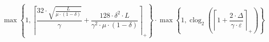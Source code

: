 \[\max\left\{ 1, \left\lceil \frac{32 \cdot \sqrt{\frac{L}{\mu \cdot \left(1 - \delta\right)}}}{\gamma} + \frac{128 \cdot \delta^{2} \cdot L}{\gamma^{2} \cdot \mu \cdot \left(1 - \delta\right)} \right\rceil_{+} \right\} \cdot \max\left\{ 1, \operatorname{clog}_{2}\left(\left\lceil 1 + \frac{2 \cdot \Delta}{\gamma \cdot \varepsilon} \right\rceil_{+}\right) \right\}\]
